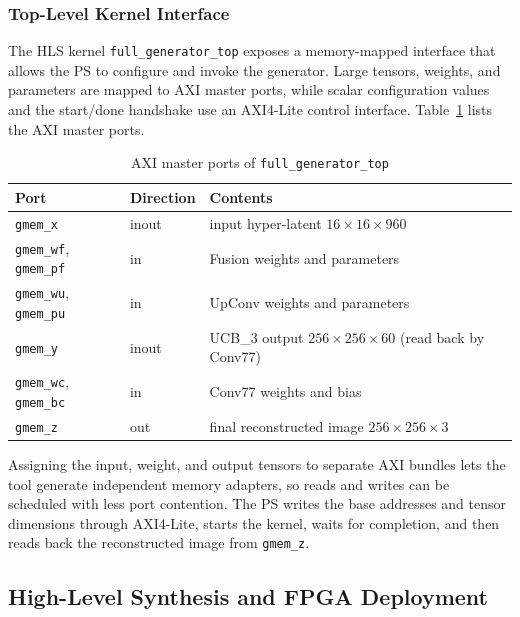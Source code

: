 \subsubsection{Top-Level Kernel Interface}

The HLS kernel \texttt{full\_generator\_top} exposes a memory-mapped interface that allows the PS to configure and invoke the generator. Large tensors, weights, and parameters are mapped to AXI master ports, while scalar configuration values and the start/done handshake use an AXI4-Lite control interface. Table~\ref{tab:axi_ports} lists the AXI master ports.

\begin{table}[H]
\centering
\caption{AXI master ports of \texttt{full\_generator\_top}}
\label{tab:axi_ports}
\begin{tabularx}{\textwidth}{|>{\raggedright\arraybackslash}p{}|>{\raggedright\arraybackslash}p{}|X|}
\hline
\textbf{Port} & \textbf{Direction} & \textbf{Contents} \\
\hline
\texttt{gmem\_x} & inout & input hyper-latent $16\times16\times960$ \\
\hline
\texttt{gmem\_wf}, \texttt{gmem\_pf} & in & Fusion weights and parameters \\
\hline
\texttt{gmem\_wu}, \texttt{gmem\_pu} & in & UpConv weights and parameters \\
\hline
\texttt{gmem\_y} & inout & UCB\_3 output $256\times256\times60$ (read back by Conv77) \\
\hline
\texttt{gmem\_wc}, \texttt{gmem\_bc} & in & Conv77 weights and bias \\
\hline
\texttt{gmem\_z} & out & final reconstructed image $256\times256\times3$ \\
\hline
\end{tabularx}
\end{table}

Assigning the input, weight, and output tensors to separate AXI bundles lets the tool generate independent memory adapters, so reads and writes can be scheduled with less port contention. The PS writes the base addresses and tensor dimensions through AXI4-Lite, starts the kernel, waits for completion, and then reads back the reconstructed image from \texttt{gmem\_z}.

\subsection{High-Level Synthesis and FPGA Deployment}


